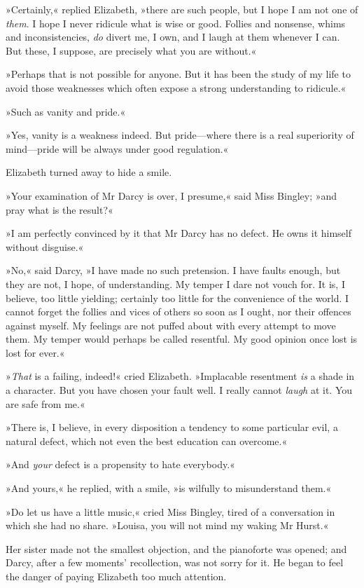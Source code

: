 »Certainly,« replied Elizabeth, »there are such people, but I hope I am not one of \textit{them}. I hope I never ridicule what is wise or good. Follies and nonsense, whims and inconsistencies, \textit{do} divert me, I own, and I laugh at them whenever I can. But these, I suppose, are precisely what you are without.«

»Perhaps that is not possible for anyone. But it has been the study of my life to avoid those weaknesses which often expose a strong understanding to ridicule.«

»Such as vanity and pride.«

»Yes, vanity is a weakness indeed. But pride—where there is a real superiority of mind—pride will be always under good regulation.«

Elizabeth turned away to hide a smile.

»Your examination of Mr Darcy is over, I presume,« said Miss Bingley; »and pray what is the result?«

»I am perfectly convinced by it that Mr Darcy has no defect. He owns it himself without disguise.«

»No,« said Darcy, »I have made no such pretension. I have faults enough, but they are not, I hope, of understanding. My temper I dare not vouch for. It is, I believe, too little yielding; certainly too little for the convenience of the world. I cannot forget the follies and vices of others so soon as I ought, nor their offences against myself. My feelings are not puffed about with every attempt to move them. My temper would perhaps be called resentful. My good opinion once lost is lost for ever.«

»\textit{That} is a failing, indeed!« cried Elizabeth. »Implacable resentment \textit{is} a shade in a character. But you have chosen your fault well. I really cannot \textit{laugh} at it. You are safe from me.«

»There is, I believe, in every disposition a tendency to some particular evil, a natural defect, which not even the best education can overcome.«

»And \textit{your} defect is a propensity to hate everybody.«

»And yours,« he replied, with a smile, »is wilfully to misunderstand them.«

»Do let us have a little music,« cried Miss Bingley, tired of a conversation in which she had no share. »Louisa, you will not mind my waking Mr Hurst.«

Her sister made not the smallest objection, and the pianoforte was opened; and Darcy, after a few moments' recollection, was not sorry for it. He began to feel the danger of paying Elizabeth too much attention.